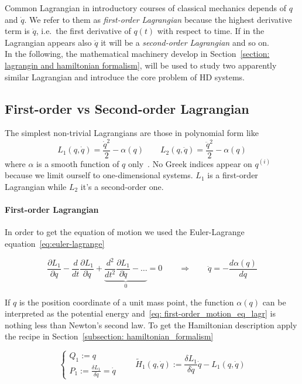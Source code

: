 Common Lagrangian in introductory courses of classical mechanics depends of $q$
and $\dot{q}$. We refer to them as \emph{first-order Lagrangian} because the
highest derivative term is $\dot{q}$, i.e.\ the first derivative of $q(t)$ with
respect to time. If in the Lagrangian appears also $\ddot{q}$ it will be a
\emph{second-order Lagrangian} and so on. \\

In the following, the mathematical machinery develop in Section~\ref{section:
lagrangin and hamiltonian formalism}, will be used to study two apparently
similar Lagrangian and introduce the core problem of HD systems.

\subsection{First-order vs Second-order Lagrangian}
The simplest non-trivial Lagrangians are those in polynomial form like
\begin{equation*}
  L_1(q, \dot{q}) = \frac{\dot{q}^2}{2} - \alpha(q) \qquad
  L_2(q, \ddot{q}) = \frac{\ddot{q}^2}{2} - \alpha(q)
\end{equation*}
where $\alpha$ is a smooth function of $q$ only~\cite{Chen13}. No Greek indices
appear on $q^{(i)}$ because we limit ourself to one-dimensional systems. $L_1$
is a first-order Lagrangian while $L_2$ it's a second-order one.

\paragraph{First-order Lagrangian} In order to get the equation of motion we
used the Euler-Lagrange equation~\eqref{eq:euler-lagrange}

\begin{equation} \label{eq: first-order_motion_eq_lagr}
  \frac{\partial L_1}{\partial q} -
  \frac{d}{dt}\frac{\partial L_1}{\partial \dot{q}} +
  \underbrace{
  \frac{d^2}{dt^2}\frac{\partial L_1}{\partial \ddot{q}} - \ldots }_0 = 0
  \qquad \Rightarrow \qquad
  \ddot{q} = - \frac{d\alpha(q)}{dq}
\end{equation}

If $q$ is the position coordinate of a unit mass point, the function $\alpha(q)$
can be interpreted as the potential energy and~\eqref{eq:
first-order_motion_eq_lagr} is nothing less than Newton's second law. To get the
Hamiltonian description apply the recipe in Section~\ref{subsection:
hamiltonian_formalism}

\begin{equation*}
  \begin{cases}
    Q_1 := q \\
    P_1 := \frac{\delta L_1}{\delta \dot{q}} = \dot{q}
  \end{cases}
  \qquad
  \tilde{H}_1(q, \dot{q}) :=
  \frac{\delta L_1}{\delta \dot{q}} \dot{q} - L_1(q, \dot{q})
\end{equation*}

